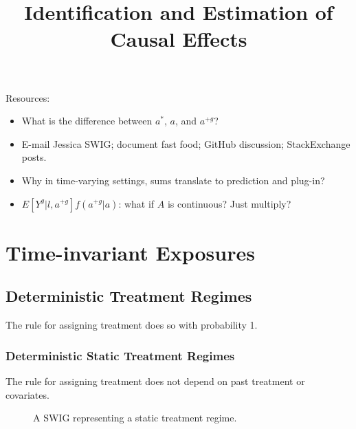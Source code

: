 \documentclass[12pt]{article}
\begin{document}
\title{Identification and Estimation of Causal Effects}
\maketitle

Resources:
\begin{itemize}
    \item What is the difference between $a^*$, $a$, and $a^{+g}$?
    \item E-mail Jessica SWIG; document fast food; GitHub discussion; StackExchange posts.
    \item Why in time-varying settings, sums translate to prediction and plug-in?
    \item $E[Y^g|l,a^{+g}]f(a^{+g}|a)$: what if $A$ is continuous? Just multiply?
\end{itemize}

\section{Time-invariant Exposures}

\subsection{Deterministic Treatment Regimes}
The rule for assigning treatment does so with probability 1.

\subsubsection*{Deterministic Static Treatment Regimes}
The rule for assigning treatment does not depend on past treatment or covariates.

\begin{figure}[h]
\centering
{}
\caption{A SWIG representing a static treatment regime.}
\label{fig:swig_det_stat_inv}
\end{figure}
\end{document}
